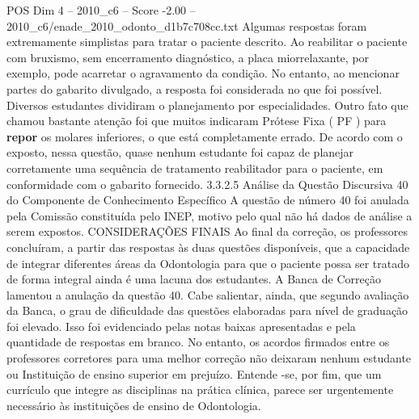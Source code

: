 \begin{textsample}{POS Dim 4 – 2010\_c6 – Score -2.00 – 2010\_c6/enade\_2010\_odonto\_d1b7c708cc.txt}
Algumas respostas foram extremamente simplistas para tratar o paciente descrito.
Ao reabilitar o paciente com bruxismo, sem encerramento diagnóstico, a placa miorrelaxante, por exemplo, pode acarretar o agravamento da condição.
No entanto, ao mencionar partes do gabarito divulgado, a resposta foi considerada no que foi possível.
Diversos estudantes dividiram o planejamento por especialidades.
Outro fato que chamou bastante atenção foi que muitos indicaram Prótese Fixa ( PF ) para \textbf{repor} os molares inferiores, o que está completamente errado.
De acordo com o exposto, nessa questão, quase nenhum estudante foi capaz de planejar corretamente uma sequência de tratamento reabilitador para o paciente, em conformidade com o gabarito fornecido. 3.3.2.5 Análise da Questão Discursiva 40 do Componente de Conhecimento Específico A questão de número 40 foi anulada pela Comissão constituída pelo INEP, motivo pelo qual não há dados de análise a serem expostos.
CONSIDERAÇÕES FINAIS Ao final da correção, os professores concluíram, a partir das respostas às duas questões disponíveis, que a capacidade de integrar diferentes áreas da Odontologia para que o paciente possa ser tratado de forma integral ainda é uma lacuna dos estudantes.
A Banca de Correção lamentou a anulação da questão 40.
Cabe salientar, ainda, que segundo avaliação da Banca, o grau de dificuldade das questões elaboradas para nível de graduação foi elevado.
Isso foi evidenciado pelas notas baixas apresentadas e pela quantidade de respostas em branco.
No entanto, os acordos firmados entre os professores corretores para uma melhor correção não deixaram nenhum estudante ou Instituição de ensino superior em prejuízo.
Entende -se, por fim, que um currículo que integre as disciplinas na prática clínica, parece ser urgentemente necessário às instituições de ensino de Odontologia.

\end{textsample}
